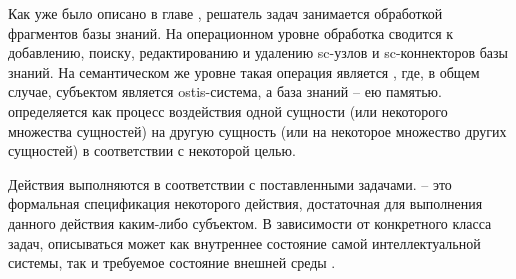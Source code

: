 Как уже было описано в главе , решатель задач занимается обработкой фрагментов базы знаний. На операционном уровне обработка сводится к добавлению, поиску, редактированию и удалению sc-узлов и sc-коннекторов базы знаний. На семантическом же уровне такая операция является , где, в общем случае, субъектом является ostis-система, а база знаний -- ею памятью.  определяется как процесс воздействия одной сущности (или некоторого множества сущностей) на другую сущность (или на некоторое множество других сущностей) в соответствии с некоторой целью.

Действия выполняются в соответствии с поставленными задачами.   -- это формальная спецификация некоторого действия, достаточная для выполнения данного действия каким-либо субъектом. В зависимости от конкретного класса задач, описываться может как внутреннее состояние самой интеллектуальной системы, так и требуемое состояние внешней среды .


